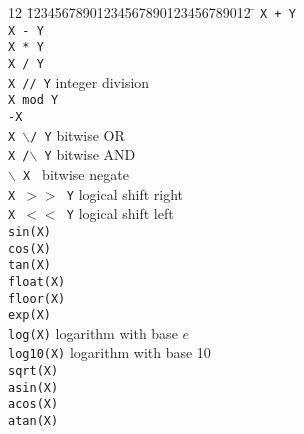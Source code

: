 \begin{tabbing}
12 \= 12345678901234567890123456789012 \=	\kill
 \> {\tt X + Y}			\>					\\
 \> {\tt X - Y}			\>					\\
 \> {\tt X * Y}			\>					\\
 \> {\tt X / Y}			\>					\\
 \> {\tt X // Y}		\> integer division			\\
 \> {\tt X mod Y}		\>					\\
 \> {\tt -X}			\>					\\
 \> {\tt X $\backslash$/ Y}	\> bitwise OR				\\
 \> {\tt X /$\backslash$ Y}	\> bitwise AND				\\
 \> {\tt $\backslash$ X }	\> bitwise negate			\\
 \> {\tt X $>>$ Y}		\> logical shift right			\\
 \> {\tt X $<<$ Y}		\> logical shift left			\\
 \> {\tt sin(X)}		\>					\\
 \> {\tt cos(X)}		\>					\\
 \> {\tt tan(X)}		\>					\\
 \> {\tt float(X)}		\>					\\
 \> {\tt floor(X)}		\>					\\
 \> {\tt exp(X)}		\>					\\
 \> {\tt log(X)}		\> logarithm with base $e$		\\
 \> {\tt log10(X)}		\> logarithm with base 10		\\
 \> {\tt sqrt(X)}		\>					\\
 \> {\tt asin(X)}		\>					\\
 \> {\tt acos(X)}		\>					\\
 \> {\tt atan(X)}		\>					\\
\end{tabbing}


